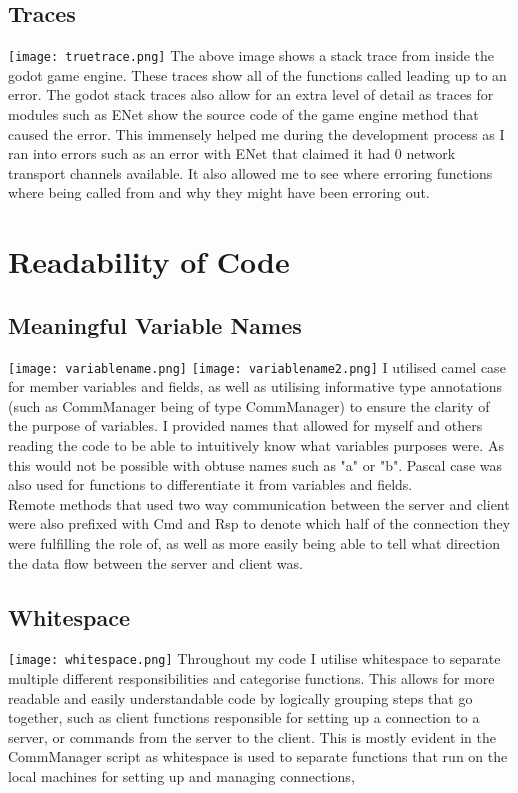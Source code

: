 \documentclass[12pt, DIV=calc]{scrartcl}
\begin{document}
\subsection{Traces}
\texttt{[image: truetrace.png]}
The above image shows a stack trace from inside the godot game engine. These traces show all of the functions called leading up to an error. The godot stack traces also allow for an extra level of detail as traces for modules such as ENet show the source code of the game engine method that caused the error. This immensely helped me during the development process as I ran into errors such as an error with ENet that claimed it had 0 network transport channels available. It also allowed me to see where erroring functions where being called from and why they might have been erroring out.







\clearpage
\section{Readability of Code}
\subsection{Meaningful Variable Names} 
\texttt{[image: variablename.png]}
\texttt{[image: variablename2.png]}
I utilised camel case for member variables and fields, as well as utilising informative type annotations (such as CommManager being of type CommManager) to ensure the clarity of the purpose of variables. I provided names that allowed for myself and others reading the code to be able to intuitively know what variables purposes were. As this would not be possible with obtuse names such as "a" or "b". Pascal case was also used for functions to differentiate it from variables and fields. \\

Remote methods that used two way communication between the server and client were also prefixed with Cmd and Rsp to denote which half of the connection they were fulfilling the role of, as well as more easily being able to tell what direction the data flow between the server and client was.

\subsection{Whitespace}
\texttt{[image: whitespace.png]}
Throughout my code I utilise whitespace to separate multiple different responsibilities and categorise functions. This allows for more readable and easily understandable code by logically grouping steps that go together, such as client functions responsible for setting up a connection to a server, or commands from the server to the client. This is mostly evident in the CommManager script as whitespace is used to separate functions that run on the local machines for setting up and managing connections, 
\end{document}
